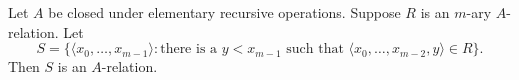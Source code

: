 Let $A$ be closed under elementary recursive operations. Suppose $R$ is an $m$-ary $A$-relation. Let
$$S = \{ \langle x_0, \ldots, x_{m-1} \rangle : \text{there is a } y < x_{m-1} \text{ such that } \langle x_0, \ldots, x_{m-2}, y \rangle \in R \}.$$
Then $S$ is an $A$-relation.
